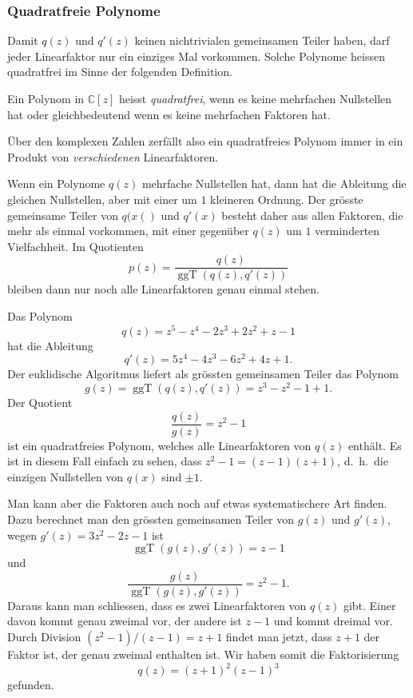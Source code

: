 %
%
\subsubsection{Quadratfreie Polynome}
Damit $q(z)$ und $q'(z)$ keinen nichtrivialen gemeinsamen Teiler
haben, darf jeder Linearfaktor nur ein einziges Mal vorkommen.
Solche Polynome heissen quadratfrei im Sinne der folgenden
Definition.

\begin{definition}[quadratfrei]
Ein Polynom in $\mathbb{C}[z]$ heisst \emph{quadratfrei}, wenn es
keine mehrfachen Nullstellen hat oder gleichbedeutend wenn es keine
mehrfachen Faktoren hat.
%
\end{definition}

Über den komplexen Zahlen zerfällt also ein quadratfreies Polynom
immer in ein Produkt von \emph{verschiedenen} Linearfaktoren.

Wenn ein Polynome $q(z)$ mehrfache Nullstellen hat, dann hat die
Ableitung die gleichen Nullstellen, aber mit einer um $1$ kleineren
Ordnung.
Der grösste gemeinsame Teiler von $q(x()$ und $q'(x)$ besteht
daher aus allen Faktoren, die mehr als einmal vorkommen, mit einer
gegenüber $q(z)$ um $1$ verminderten Vielfachheit.
Im Quotienten
\[
p(z)
=
\frac{q(z)}{\operatorname{ggT}(q(z),q'(z))}
\]
bleiben dann nur noch alle Linearfaktoren genau einmal stehen.

\begin{beispiel}
Das Polynom 
\[
q(z)
=
z^5-z^4-2z^3+2z^2+z-1
\]
hat die Ableitung
\[
q'(z)
=
5z^4-4z^3-6z^2+4z+1.
\]
Der euklidische Algoritmus liefert als grössten gemeinsamen
Teiler das Polynom
\[
g(z)
=
\operatorname{ggT}(q(z), q'(z))
=
z^3-z^2-1+1.
\]
Der Quotient
\[
\frac{q(z)}{g(z)}
=
z^2-1
\]
ist ein quadratfreies Polynom, welches alle Linearfaktoren von $q(z)$
enthält.
Es ist in diesem Fall einfach zu sehen, dass $z^2-1=(z-1)(z+1)$,
d.~h.~die einzigen Nullstellen von $q(x)$ sind $\pm 1$.

Man kann aber die Faktoren auch noch auf etwas systematischere Art
finden.
Dazu berechnet man den grössten gemeinsamen Teiler von $g(z)$ und $g'(z)$,
wegen $g'(z) = 3z^2 -2z -1$ ist
\[
\operatorname{ggT}(g(z),g'(z))
=
z-1
\]
und
\[
\frac{g(z)}{\operatorname{ggT}(g(z),g'(z))}
=
z^2-1.
\]
Daraus kann man schliessen, dass es zwei Linearfaktoren von $q(z)$
gibt.
Einer davon kommt genau zweimal vor, der andere ist $z-1$ und kommt
dreimal vor.
Durch Division $(z^2-1)/(z-1)=z+1$ findet man jetzt, dass $z+1$
der Faktor ist, der genau zweimal enthalten ist.
Wir haben somit die Faktorisierung
\[
q(z)
=
(z+1)^2 (z-1)^3
\]
gefunden.
\end{beispiel}

